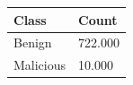 \begin{tabular}{ll}
\toprule
Class & Count \\
\midrule
Benign & 722.000 \\
Malicious & 10.000 \\
\bottomrule
\end{tabular}